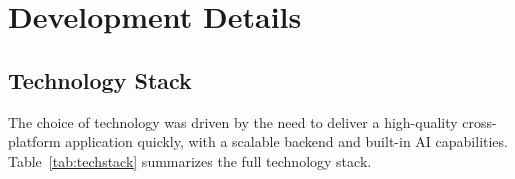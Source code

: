 \section{Development Details}

\subsection{Technology Stack}

The choice of technology was driven by the need to deliver a high-quality
cross-platform application quickly, with a scalable backend and built-in AI
capabilities. Table~\ref{tab:techstack} summarizes the full technology stack.

